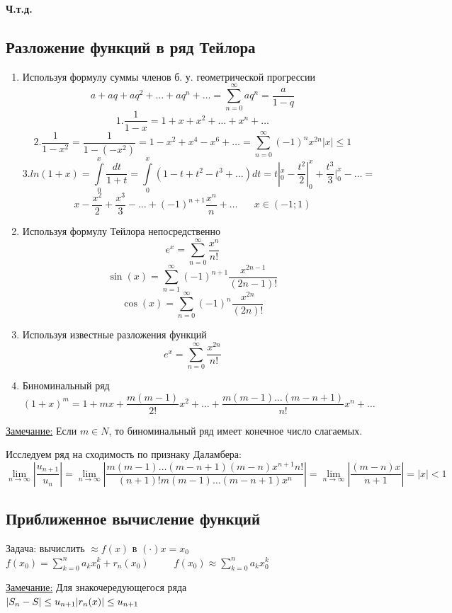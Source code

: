 \documentclass[12pt]{article}
\let\oldint\int
\let\oldsum\sum
\let\oldlim\lim
\renewcommand{\int}{\oldint\limits}
\renewcommand{\sum}{\oldsum\limits}
\renewcommand{\lim}{\oldlim\limits}
\begin{document}
    \begin{center}
      \textbf{Ч.т.д.}
    \end{center}

    \subsection{Разложение функций в ряд Тейлора}
    \begin{enumerate}
      \item Используя формулу суммы членов б. у. геометрической прогрессии
      \[a+aq+aq^2+\dots+aq^n+\dots=\sum_{n=0}^{\infty}aq^n=\frac{a}{1-q}\]
      \[1. \frac{1}{1-x}=1+x+x^2+\dots+x^n+\dots\]
      \[2. \frac{1}{1-x^2}=\frac{1}{1-(-x^2)}=1-x^2+x^4-x^6+\dots=\sum_{n=0}^{\infty}(-1)^n x^{2n} |x|\leq 1\]
      \[3. ln(1+x)=\int_{0}^{x}\frac{dt}{1+t}=\int_{0}^{x}(1-t+t^2-t^3+\dots)dt=t|^x_0-\frac{t^2}{2}|^x_0+\frac{t^3}{3}|^x_0-\dots=\]
      \[x-\frac{x^2}{2}+\frac{x^3}{3}-\dots+(-1)^{n+1}\frac{x^n}{n}+\dots \hspace{20pt} x \in (-1;1)\]

      \item Используя формулу Тейлора непосредственно
      \[e^x=\sum_{n=0}^{\infty}\frac{x^n}{n!}\]
      \[\sin(x)=\sum_{n=1}^{\infty}(-1)^{n+1}\frac{x^{2n-1}}{(2n-1)!}\]
      \[\cos(x)=\sum_{n=0}^{\infty}(-1)^n \frac{x^{2n}}{(2n)!}\]

      \item Используя известные разложения функций
      \[e^x=\sum_{n=0}^{\infty} \frac{x^{2n}}{n!}\]

      \item Биноминальный ряд
      \[(1+x)^m=1+mx+\frac{m(m-1)}{2!}x^2+\dots+\frac{m(m-1)\dots(m-n+1)}{n!}x^n+\dots\]
    \end{enumerate}

    \underline{Замечание:} Если $m \in N$, то биноминальный ряд имеет конечное число слагаемых.

    Исследуем ряд на сходимость по признаку Даламбера:
    \[\lim_{n \to \infty} |\frac{u_{n+1}}{u_n}|=
    \lim_{n \to \infty}|\frac{m(m-1)\dots(m-n+1)(m-n)x^{n+1}n!}{(n+1)!m(m-1)\dots(m-n+1)x^n}|=
    \lim_{n \to \infty} |\frac{(m-n)x}{n+1}|=|x|<1\]

    \subsection*{Приближенное вычисление функций}
    Задача: вычислить $\approx f(x)$ в $(\cdot) x=x_0$\\
    
    $
     f(x_0)=\sum_{k=0}^{n} a_k x_0^k+r_n(x_0) \hspace{30pt}
     f(x_0) \approx \sum_{k=0}^{n} a_k x_0^k 
    $

    \underline{Замечание:} Для знакочередующегося ряда\\
    $
    |S_n-S|\leq u_{n+1}\\
    |r_n(x)|\leq u_{n+1}
    $
    
    
\end{document}
